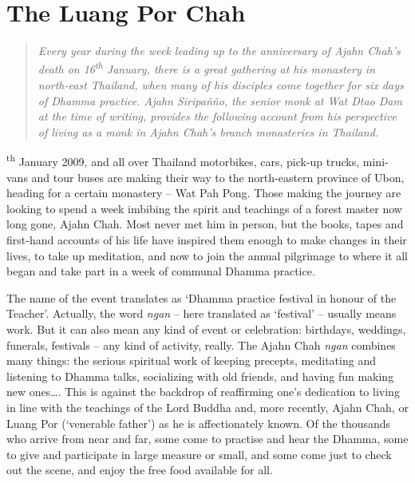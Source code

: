 
\chapter[The Luang Por Chah Memorial Week]{The Luang Por Chah\newline {}}

\begin{quote}\itshape
Every year during the week leading up to the anniversary of Ajahn
Chah's death on 16\textsuperscript{th} January, there is a great
gathering at his monastery in north-east Thailand, when many of his
disciples come together for six days of Dhamma practice. Ajahn
Siripañño, the senior monk at Wat Dtao Dam at the time of writing, provides the
following account from his perspective of living as a monk in Ajahn
Chah's branch monasteries in Thailand.
\end{quote}

\textsuperscript{th} January 2009, and all over Thailand motorbikes,
cars, pick-up trucks, mini-vans and tour buses are making their way to
the north-eastern province of Ubon, heading for a certain monastery --
Wat Pah Pong. Those making the journey are looking to spend a week
imbibing the spirit and teachings of a forest master now long gone,
Ajahn Chah. Most never met him in person, but the books, tapes and
first-hand accounts of his life have inspired them enough to make changes
in their lives, to take up meditation, and now to join the annual
pilgrimage to where it all began and take part in a week of communal
Dhamma practice. 

The name of the event translates as `Dhamma practice festival in honour
of the Teacher'. Actually, the word \emph{ngan} -- here translated as
`festival' -- usually means work. But it can also mean any kind of event
or celebration: birthdays, weddings, funerals, festivals -- any kind of
activity, really. The Ajahn Chah \emph{ngan} combines many things: the
serious spiritual work of keeping precepts, meditating and listening to
Dhamma talks, socializing with old friends, and having fun making new
ones\ldots{}. This is against the backdrop of reaffirming one's
dedication to living in line with the teachings of the Lord Buddha and, 
more recently, Ajahn Chah, or Luang Por (`venerable father') as he is
affectionately known. Of the thousands who arrive from near and far, 
some come to practise and hear the Dhamma, some to give and participate
in large measure or small, and some come just to check out the scene, 
and enjoy the free food available for all. 

